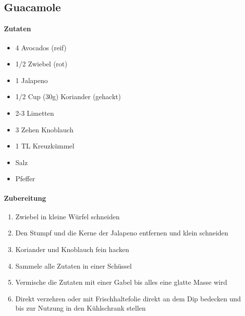 \newpage
\subsection{Guacamole }
\paragraph{Zutaten}
\begin{itemize}[noitemsep]
	\item 4 Avocados (reif)
	\item 1/2 Zwiebel (rot)
	\item 1 Jalapeno
	\item 1/2 Cup (30g) Koriander (gehackt)
	\item 2-3 Limetten
	\item 3 Zehen Knoblauch
	\item 1 TL Kreuzkümmel
	\item Salz
	\item Pfeffer
\end{itemize}
\paragraph{Zubereitung}
\begin{enumerate}[noitemsep]
	\item Zwiebel in kleine Würfel schneiden
	\item Den Stumpf und die Kerne der Jalapeno entfernen und klein schneiden
	\item Koriander und Knoblauch fein hacken
	\item Sammele alle Zutaten in einer Schüssel 
	\item Vermische die Zutaten mit einer Gabel bis alles eine glatte Masse wird
	\item Direkt verzehren oder mit Frischhaltefolie direkt an dem Dip bedecken und bis zur Nutzung in den Kühlschrank stellen
\end{enumerate}
